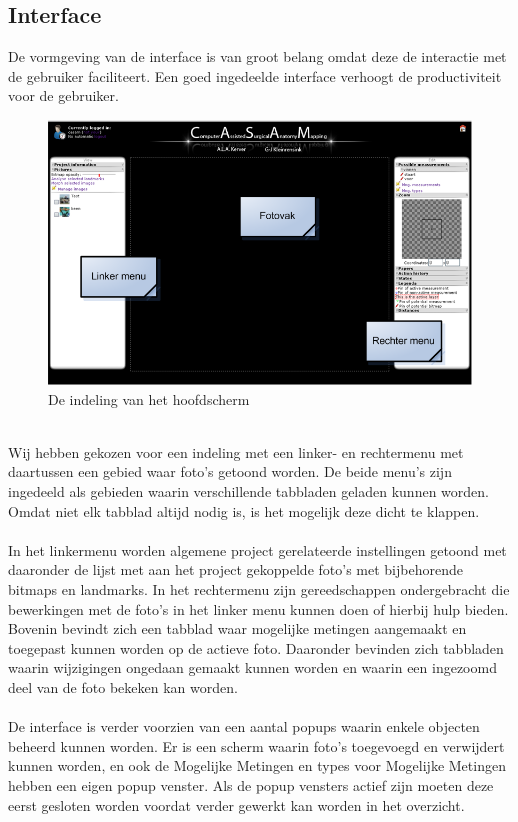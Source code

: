 \subsection{Interface}
\label{interface}
De vormgeving van de interface is van groot belang omdat deze de interactie met de gebruiker faciliteert. Een goed ingedeelde interface verhoogt de productiviteit voor de gebruiker.
\\
\begin{figure}[htbp]
\includegraphics[width=\textwidth]{fig_main}
\caption{De indeling van het hoofdscherm}
\label{fig:hoofdscherm_indeling}
\end{figure}
\\
Wij hebben gekozen voor een indeling met een linker- en rechtermenu met daartussen een gebied waar foto's getoond worden. De beide menu's zijn ingedeeld als gebieden waarin verschillende tabbladen geladen kunnen worden. Omdat niet elk tabblad altijd nodig is, is het mogelijk deze dicht te klappen.
\\
\\
In het linkermenu worden algemene project gerelateerde instellingen getoond met daaronder de lijst met aan het project gekoppelde foto's met bijbehorende bitmaps en landmarks. In het rechtermenu zijn gereedschappen ondergebracht die bewerkingen met de foto's in het linker menu kunnen doen of hierbij hulp bieden. Bovenin bevindt zich een tabblad waar mogelijke metingen aangemaakt en toegepast kunnen worden op de actieve foto. Daaronder bevinden zich tabbladen waarin wijzigingen ongedaan gemaakt kunnen worden en waarin een ingezoomd deel van de foto bekeken kan worden.
\\
\\
De interface is verder voorzien van een aantal popups waarin enkele objecten beheerd kunnen worden. Er is een scherm waarin foto's toegevoegd en verwijdert kunnen worden, en ook de Mogelijke Metingen en types voor Mogelijke Metingen hebben een eigen popup venster. Als de popup vensters actief zijn moeten deze eerst gesloten worden voordat verder gewerkt kan worden in het overzicht.

